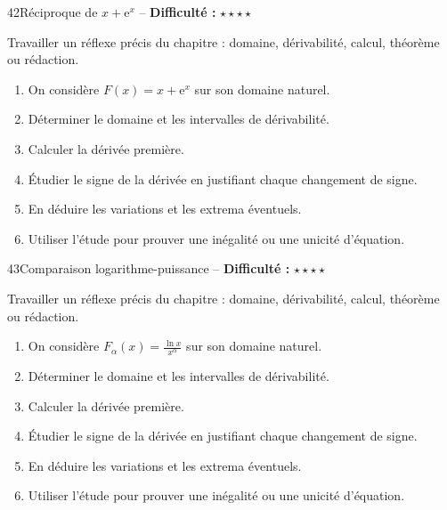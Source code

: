 \documentclass[11pt,a4paper]{article}
\newcommand{\e}{\mathrm{e}}
\newcommand{\etoiles}[1]{\textbf{Difficulté :} #1}
\begin{document}
\begin{exobox}{42}{Réciproque de $x+\e^x$ -- \etoiles{$\star\star\star\star$}}

\begin{objectifbox}
Travailler un réflexe précis du chapitre : domaine, dérivabilité, calcul, théorème ou rédaction.
\end{objectifbox}

\begin{enumerate}

\item On considère $F(x)=x+\e^x$ sur son domaine naturel.

\item Déterminer le domaine et les intervalles de dérivabilité.

\item Calculer la dérivée première.

\item Étudier le signe de la dérivée en justifiant chaque changement de signe.

\item En déduire les variations et les extrema éventuels.

\item Utiliser l'étude pour prouver une inégalité ou une unicité d'équation.

\end{enumerate}

\end{exobox}


\begin{exobox}{43}{Comparaison logarithme-puissance -- \etoiles{$\star\star\star\star$}}

\begin{objectifbox}
Travailler un réflexe précis du chapitre : domaine, dérivabilité, calcul, théorème ou rédaction.
\end{objectifbox}

\begin{enumerate}

\item On considère $F_\alpha(x)=\frac{\ln x}{x^\alpha}$ sur son domaine naturel.

\item Déterminer le domaine et les intervalles de dérivabilité.

\item Calculer la dérivée première.

\item Étudier le signe de la dérivée en justifiant chaque changement de signe.

\item En déduire les variations et les extrema éventuels.

\item Utiliser l'étude pour prouver une inégalité ou une unicité d'équation.

\end{enumerate}

\end{exobox}
\end{document}
